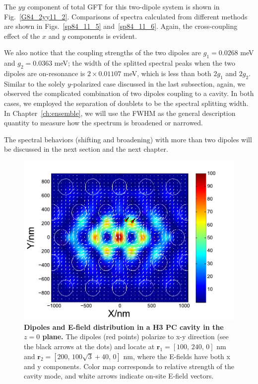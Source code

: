 The $yy$ component of total GFT for this two-dipole system is shown in Fig.~\ref{G84_2yy11_2}. Comparisons of spectra calculated from different methods are shown in Figs.~\ref{sp84_11_5} and~\ref{sp84_11_6}. Again, the cross-coupling effect of the $x$ and $y$ components is evident.

We also notice that the coupling strengths of the two dipoles are $g_1=0.0268$ meV and $g_2=0.0363$ meV; the width of the splitted spectral peaks when the two dipoles are on-resonance is $2\times 0.01107$ meV, which is less than both $2g_1$ and $2g_2$. Similar to the solely $y$-polarized case discussed in the last subsection, again, we observed the complicated combination of two dipoles coupling to a cavity. In both cases, we employed the separation of doublets to be the spectral splitting width. In Chapter~\ref{ch:ensemble}, we will use the FWHM as the general description quantity to measure how the spectrum is broadened or narrowed.

The spectral behaviors (shifting and broadening) with more than two dipoles will be discussed in the next section and the next chapter.
\begin{figure}[H]
\centering
\begin{center}
\includegraphics[width=14cm]{./Figs/dotsmode2_2}
\end{center}
\caption[Dipole and E-field distribution in a H3 PC cavity structure.]{\textbf{  Dipoles and E-field distribution in a H3 PC cavity in the $z=0$ plane.}  The dipoles (red points) polarize to x-y direction (see the black arrows at the dots) and locate at $\mathbf{r}_1=[100,\, 240,\, 0]$ nm and $\mathbf{r}_2=[200,\, 100\sqrt{3}+40, \, 0]$ nm, where the E-fields have both x and y components. Color map corresponds to relative strength of the cavity mode, and white arrows indicate on-site E-field vectors.}
\label{dotsmode2_2}
\end{figure}


